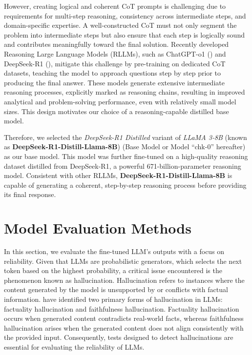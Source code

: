 However, creating logical and coherent CoT prompts is challenging due to requirements for multi-step reasoning, consistency across intermediate steps, and domain-specific expertise. A well-constructed CoT must not only segment the problem into intermediate steps but also ensure that each step is logically sound and contributes meaningfully toward the final solution. Recently developed Reasoning Large Language Models (RLLMs), such as ChatGPT-o1 (\cite{jaech2024openai}) and DeepSeek-R1 (\cite{shao2024deepseekmath}), mitigate this challenge by pre-training on dedicated CoT datasets, teaching the model to approach questions step by step prior to producing the final answer. These models generate extensive intermediate reasoning processes, explicitly marked as reasoning chains, resulting in improved analytical and problem-solving performance, even with relatively small model sizes. This design motivates our choice of a reasoning-capable distilled base model.


Therefore, we selected the \textit{DeepSeek-R1 Distilled} variant of \textit{LLaMA 3-8B} (known as \textbf{DeepSeek-R1-Distill-Llama-8B}) (Base Model or Model ``chk-0'' hereafter) as our base model. This model was further fine-tuned on a high-quality reasoning dataset distilled from DeepSeek-R1, a powerful 671-billion-parameter reasoning model. Consistent with other RLLMs, \textbf{DeepSeek-R1-Distill-Llama-8B} is capable of generating a coherent, step-by-step reasoning process before providing its final response.









\section{Model Evaluation Methods}\label{ch2:sec:applictaion}


In this section, we evaluate the fine-tuned LLM's outputs with a focus on reliability. Given that LLMs are probabilistic generators, which selects the next token based on the highest probability, a critical issue encountered is the phenomenon known as hallucination. Hallucination refers to instances where the content generated by the model is unsupported by or conflicts with factual information. \cite{huang2025survey} have identified two primary forms of hallucination in LLMs: factuality hallucination and faithfulness hallucination. Factuality hallucination occurs when generated content contradicts real-world facts, whereas faithfulness hallucination arises when the generated content does not align consistently with the provided input. Consequently, tests designed to detect hallucinations are essential for evaluating the reliability of LLMs.




